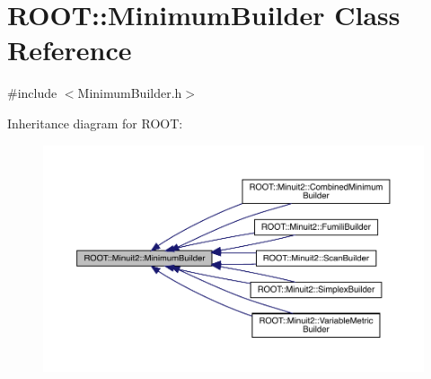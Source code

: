 \hypertarget{classROOT_1_1Minuit2_1_1MinimumBuilder}{}\section{R\+O\+OT\+:\+:Minimum\+Builder Class Reference}
\label{classROOT_1_1Minuit2_1_1MinimumBuilder}


{\ttfamily \#include $<$Minimum\+Builder.\+h$>$}



Inheritance diagram for R\+O\+OT\+:\nopagebreak
\begin{figure}[H]
\begin{center}
\leavevmode
\includegraphics[width=350pt]{d1/d89/classROOT_1_1Minuit2_1_1MinimumBuilder__inherit__graph}
\end{center}
\end{figure}
